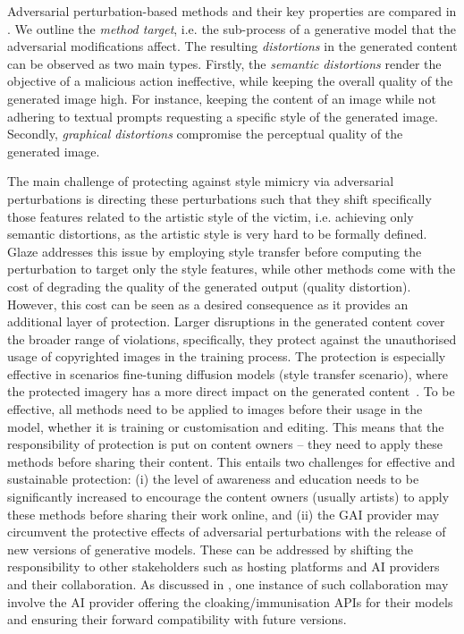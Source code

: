 \documentclass[conference,table]{IEEEtran} %
\begin{document}

Adversarial perturbation-based methods and their key properties are compared in . 
We outline the \textit{method target}, i.e. the sub-process of a generative model that the adversarial modifications affect.
The resulting \textit{distortions} in the generated content can be observed as two main types. 
Firstly, the \textit{semantic distortions} render the objective of a malicious action ineffective, while keeping the overall quality of the generated image high. 
For instance, keeping the content of an image while not adhering to textual prompts requesting a specific style of the generated image. 
Secondly, \textit{graphical distortions} compromise the perceptual quality of the generated image. %

The main challenge of protecting against style mimicry via adversarial perturbations is directing these perturbations such that they shift specifically those features related to the artistic style of the victim, i.e. achieving only semantic distortions, as the artistic style is very hard to be formally defined. 
Glaze addresses this issue by employing style transfer before computing the perturbation to target only the style features, while other methods come with the cost of degrading the quality of the generated output (quality distortion).
However, this cost can be seen as a desired consequence as it provides an additional layer of protection. 
Larger disruptions in the generated content cover the broader range of violations, specifically, they protect against the unauthorised usage of copyrighted images in the training process. 
The protection is especially effective in scenarios fine-tuning diffusion models (style transfer scenario), where the protected imagery has a more direct impact on the generated content~\cite{liang_mist_2023}.
To be effective, all methods need to be applied to images before their usage in the model, whether it is training or customisation and editing. 
This means that the responsibility of protection is put on content owners -- they need to apply these methods before sharing their content.
This entails two challenges for effective and sustainable protection: (i) the level of awareness and education needs to be significantly increased to encourage the content owners (usually artists) to apply these methods before sharing their work online, and (ii) the GAI provider may circumvent the protective effects of adversarial perturbations with the release of new versions of generative models. 
These can be addressed by shifting the responsibility to other stakeholders such as hosting platforms and AI providers and their collaboration. 
As discussed in \cite{salman_raising_2023}, one instance of such collaboration may involve the AI provider offering the cloaking/immunisation APIs for their models and ensuring their forward compatibility with future versions.
\end{document}
